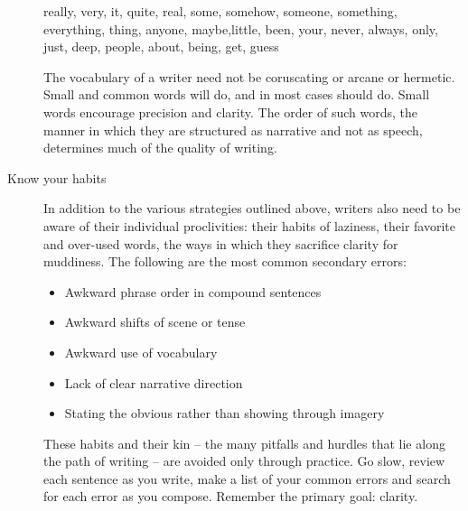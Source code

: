 \documentclass[letterpaper,10pt,headsepline]{scrreprt}
\begin{document}
\begin{description}
\textsf{really, very, it, quite, real, some, somehow, someone, something, everything, thing, anyone, maybe,little, been, your, never, always, only, just, deep, people, about, being, get, guess
}
\vspace{1em}

The vocabulary of a writer need not be coruscating or arcane or hermetic. Small and common words will do, and in most cases should do. Small words encourage precision and clarity. The order of such words, the manner in which they are structured as narrative and not as speech, determines much of the quality of writing.

\item [Know your habits] In addition to the various strategies outlined above, writers also need to be aware of their individual proclivities: their habits of laziness, their favorite and over-used words, the ways in which they sacrifice clarity for muddiness. The following are the most common secondary errors:

\begin{itemize}\item Awkward phrase order in compound sentences
\item Awkward shifts of scene or tense
\item Awkward use of vocabulary
\item Lack of clear narrative direction
\item Stating the obvious rather than showing through imagery
\end{itemize}

These habits and their kin -- the many pitfalls and hurdles that lie along the path of writing -- are avoided only through practice. Go slow, review each sentence as you write, make a list of your common errors and search for each error as you compose. Remember the primary goal: clarity.

\end{description}
\end{document}
